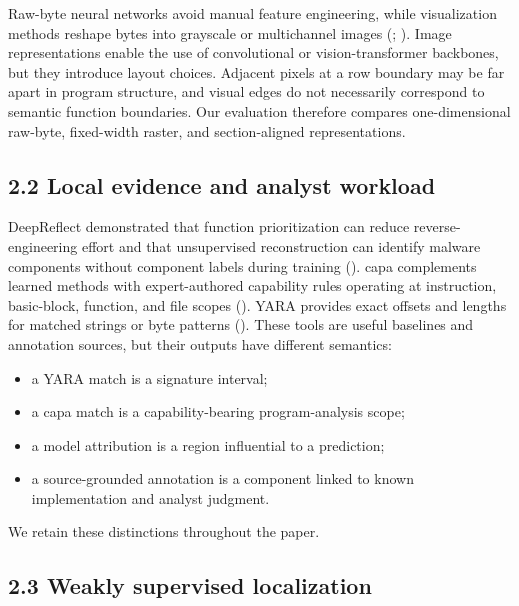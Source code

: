 \documentclass[
  10pt,
]{article}
\providecommand{\tightlist}{%
  \setlength{\itemsep}{0pt}\setlength{\parskip}{0pt}}
\begin{document}
Raw-byte neural networks avoid manual feature engineering, while
visualization methods reshape bytes into grayscale or multichannel
images (;
). Image
representations enable the use of convolutional or vision-transformer
backbones, but they introduce layout choices. Adjacent pixels at a row
boundary may be far apart in program structure, and visual edges do not
necessarily correspond to semantic function boundaries. Our evaluation
therefore compares one-dimensional raw-byte, fixed-width raster, and
section-aligned representations.

\subsection{2.2 Local evidence and analyst
workload}\label{local-evidence-and-analyst-workload}

DeepReflect demonstrated that function prioritization can reduce
reverse-engineering effort and that unsupervised reconstruction can
identify malware components without component labels during training
(). capa
complements learned methods with expert-authored capability rules
operating at instruction, basic-block, function, and file scopes
(). YARA
provides exact offsets and lengths for matched strings or byte patterns
(). These tools are
useful baselines and annotation sources, but their outputs have
different semantics:

\begin{itemize}
\tightlist
\item
  a YARA match is a signature interval;
\item
  a capa match is a capability-bearing program-analysis scope;
\item
  a model attribution is a region influential to a prediction;
\item
  a source-grounded annotation is a component linked to known
  implementation and analyst judgment.
\end{itemize}

We retain these distinctions throughout the paper.

\subsection{2.3 Weakly supervised
localization}\label{weakly-supervised-localization}
\end{document}
